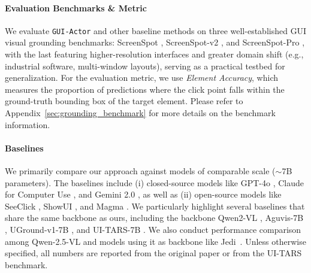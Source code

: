 \documentclass{article}
\newcommand{\kz}[1]{\textcolor{orange}{[Kanzhi: #1]}}
\newcommand{\sys}{\texttt{GUI-Actor}\xspace}
\begin{document}
\paragraph{Evaluation Benchmarks \& Metric} We evaluate \sys and other baseline methods on three well-established GUI visual grounding benchmarks: ScreenSpot \cite{cheng2024seeclick}, ScreenSpot-v2 \cite{wu2024atlas}, and ScreenSpot-Pro \cite{li2025screenspot}, with the last featuring higher-resolution interfaces and greater domain shift (e.g., industrial software, multi-window layouts), serving as a practical testbed for generalization.
For the evaluation metric, we use \textit{Element Accuracy}, which measures the proportion of predictions where the click point falls within the ground-truth bounding box of the target element. Please refer to Appendix~\ref{sec:grounding_benchmark} for more details on the benchmark information.






\paragraph{Baselines}
We primarily compare our approach against models of comparable scale ($\sim$7B parameters). The baselines include (i) closed-source models like GPT-4o \cite{openai2024gpt4o}, Claude  for Computer Use \cite{hu2024dawnguiagentpreliminary}, and Gemini 2.0 \cite{google2024gemini}, as well as (ii) open-source models like SeeClick \cite{cheng2024seeclick}, ShowUI \cite{lin2024showui}, and Magma \cite{yang2025magma}. We particularly highlight several baselines that share the same backbone as ours, including the backbone Qwen2-VL \cite{wang2024qwen2}, Aguvis-7B \cite{xu2024aguvis}, UGround-v1-7B \cite{gou2024navigating}, and UI-TARS-7B \cite{qin2025ui}. We also conduct performance comparison among Qwen-2.5-VL and models using it as backbone like Jedi~\cite{xie2025scaling}.
Unless otherwise specified, all numbers are reported from the original paper or from the UI-TARS benchmark\cite{qin2025ui}.
\end{document}
